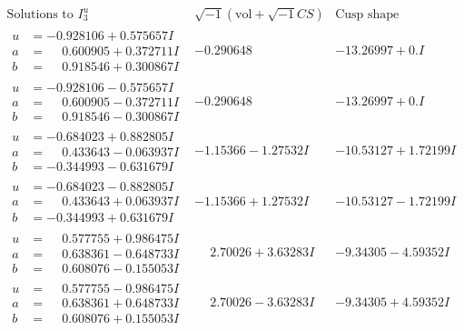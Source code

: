 \documentclass[1p]{elsarticle_modified}
\theoremstyle{definition}
\newcommand{\I}{\sqrt{-1}}
\begin{document}
$$\begin{array}{c|c|c}  
\text{Solutions to }I^u_{3}& \I (\text{vol} + \sqrt{-1}CS) & \text{Cusp shape}\\
 \hline 
\begin{aligned}
u &= -0.928106 + 0.575657 I \\
a &= \phantom{-}0.600905 + 0.372711 I \\
b &= \phantom{-}0.918546 + 0.300867 I\end{aligned}
 & -0.290648\phantom{ +0.000000I} & -13.26997 + 0. I\phantom{ +0.000000I} \\ \hline\begin{aligned}
u &= -0.928106 - 0.575657 I \\
a &= \phantom{-}0.600905 - 0.372711 I \\
b &= \phantom{-}0.918546 - 0.300867 I\end{aligned}
 & -0.290648\phantom{ +0.000000I} & -13.26997 + 0. I\phantom{ +0.000000I} \\ \hline\begin{aligned}
u &= -0.684023 + 0.882805 I \\
a &= \phantom{-}0.433643 - 0.063937 I \\
b &= -0.344993 - 0.631679 I\end{aligned}
 & -1.15366 - 1.27532 I & -10.53127 + 1.72199 I \\ \hline\begin{aligned}
u &= -0.684023 - 0.882805 I \\
a &= \phantom{-}0.433643 + 0.063937 I \\
b &= -0.344993 + 0.631679 I\end{aligned}
 & -1.15366 + 1.27532 I & -10.53127 - 1.72199 I \\ \hline\begin{aligned}
u &= \phantom{-}0.577755 + 0.986475 I \\
a &= \phantom{-}0.638361 - 0.648733 I \\
b &= \phantom{-}0.608076 - 0.155053 I\end{aligned}
 & \phantom{-}2.70026 + 3.63283 I & -9.34305 - 4.59352 I \\ \hline\begin{aligned}
u &= \phantom{-}0.577755 - 0.986475 I \\
a &= \phantom{-}0.638361 + 0.648733 I \\
b &= \phantom{-}0.608076 + 0.155053 I\end{aligned}
 & \phantom{-}2.70026 - 3.63283 I & -9.34305 + 4.59352 I \\ \hline\begin{aligned}

\end{aligned}
\end{array}$$
\end{document}

